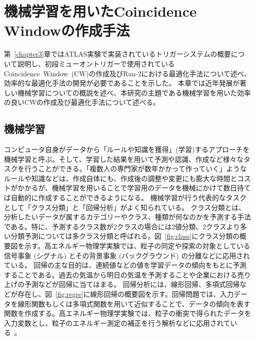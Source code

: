 \chapter{機械学習を用いたCoincidence Windowの作成手法}\label{chapter4}
第~\ref{chapter3}章ではATLAS実験で実装されているトリガーシステムの概要について説明し、初段ミューオントリガーで使用されているCoincidence~Window~(CW)の作成及びRun-2における最適化手法について述べ、効率的な最適化手法の開発が必要であることを示した。
本章では近年発展が著しい機械学習についての概説を述べ、本研究の主題である機械学習を用いた効率の良いCWの作成及び最適化手法について述べる。

\section{機械学習}\label{回帰分析}
コンピュータ自身がデータから「ルールや知識を獲得」(学習)するアプローチを機械学習と呼ぶ。そして、学習した結果を用いて予測や認識、作成など様々なタスクを行うことができる。「複数人の専門家が数年かかって作っていく」ようなルールや知識などは、作成自体にも、作成後の調整や変更にも膨大な時間とコストがかかるが、機械学習を用いることで学習用のデータを機械にかけて数日待てば自動的に作成することができるようになる\cite{book:DL}。
機械学習が行う代表的なタスクとして「クラス分類」と「回帰分析」がよく知られている。
クラス分類とは、分析したいデータが属するカテゴリーやクラス、種類が何なのかを予測する手法である。特に、予測するクラス数が2クラスの場合には2値分類、2クラスより多い分類予測については多クラス分類と呼ばれる。図~\ref{fig:class}にクラス分類の概要図を示す。高エネルギー物理学実験では、粒子の同定や探索の対象としている信号事象 (シグナル) とその背景事象 (バックグラウンド) の分離などに応用されている。
回帰の主な目的は、連続値などの値を学習データの傾向をもとに予測することである。過去の気温から明日の気温を予測することや企業における売り上げの予測などが回帰に当てはまる。
回帰分析には、線形回帰、多項式回帰などが存在し、図~\ref{fig:regre}に線形回帰の概要図を示す。回帰問題では、入力データを線形関数もしくは多項式関数を用いて近似することで、データの傾向を表す関数を作成する。高エネルギー物理学実験では、粒子の衝突で得られたデータを入力変数とし、粒子のエネルギー測定の補正を行う解析などに応用されている~\cite{article:2747266}。

